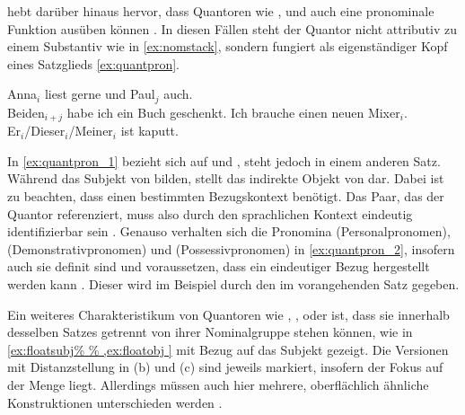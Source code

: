 \citet[790]{schwartz2000} hebt darüber hinaus hervor, dass Quantoren wie
,  und  auch eine pronominale Funktion ausüben
können \autocite[vgl.~auch][11--12]{haspelmath1997}. In diesen Fällen steht der
Quantor nicht attributiv zu einem Substantiv wie in \cref{ex:nomstack}, sondern
fungiert als eigenständiger Kopf eines Satzglieds \cref{ex:quantpron}.

\begin{exe}
\ex \label{ex:quantpron}
\begin{xlist}
	\ex Anna$_i$ liest gerne und Paul$_j$ auch.\\
		Beiden$_{i+j}$ habe ich ein Buch geschenkt.
		\label{ex:quantpron_1}
	\ex Ich brauche einen neuen Mixer$_i$.\\
		Er$_i$/Dieser$_i$/Meiner$_i$ ist kaputt.
		\label{ex:quantpron_2}
\end{xlist}
\end{exe}

In \cref{ex:quantpron_1} bezieht sich  auf  und ,
steht jedoch in einem anderen Satz. Während  das Subjekt
von  bilden, stellt  das indirekte Objekt von
 dar. Dabei ist zu beachten, dass  einen bestimmten
Bezugskontext benötigt. Das Paar, das der Quantor referenziert, muss also durch
den sprachlichen Kontext eindeutig identifizierbar sein
\autocites[vgl.~z.\,B.][274]{lyons1999}[788]{schwartz2000}[983]{janssen2004}.
Genauso verhalten sich die Pronomina  (Personalpronomen), 
(Demonstrativpronomen) und  (Possessivpronomen) in
\cref{ex:quantpron_2}, insofern auch sie definit sind und voraussetzen, dass
ein eindeutiger Bezug hergestellt werden kann
\autocites[vgl.][145--148]{lyons1999}. Dieser wird im Beispiel durch den
 im vorangehenden Satz gegeben.

Ein weiteres Charakteristikum von Quantoren wie ,
,  oder  ist, dass sie innerhalb desselben
Satzes getrennt von ihrer Nominalgruppe stehen können, wie in
\cref{ex:floatsubj%
} mit Bezug auf das Subjekt
gezeigt. Die Versionen mit Distanzstellung in (b) und (c) sind jeweils
markiert, insofern der Fokus auf der Menge liegt. Allerdings müssen auch hier
mehrere, oberflächlich ähnliche Konstruktionen unterschieden werden
\autocites[27--28]{pittner1995}[65--67]{fanselowcavar2002}.

